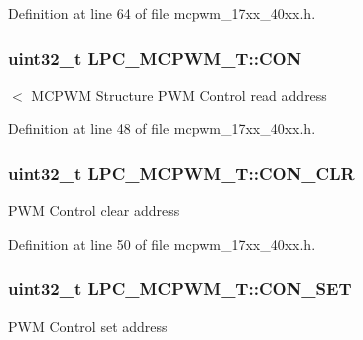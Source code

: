 Definition at line 64 of file mcpwm\+\_\+17xx\+\_\+40xx.\+h.

\subsubsection[{\texorpdfstring{C\+ON}{CON}}]{ uint32\+\_\+t L\+P\+C\+\_\+\+M\+C\+P\+W\+M\+\_\+\+T\+::\+C\+ON}\hypertarget{structLPC__MCPWM__T_ae047b5f0f2ca06bbaa663ce2458ae7ad}{}\label{structLPC__MCPWM__T_ae047b5f0f2ca06bbaa663ce2458ae7ad}
$<$ M\+C\+P\+WM Structure P\+WM Control read address 

Definition at line 48 of file mcpwm\+\_\+17xx\+\_\+40xx.\+h.

\subsubsection[{\texorpdfstring{C\+O\+N\+\_\+\+C\+LR}{CON_CLR}}]{ uint32\+\_\+t L\+P\+C\+\_\+\+M\+C\+P\+W\+M\+\_\+\+T\+::\+C\+O\+N\+\_\+\+C\+LR}\hypertarget{structLPC__MCPWM__T_a22b564b847caa28e9f0c53ff38375cc3}{}\label{structLPC__MCPWM__T_a22b564b847caa28e9f0c53ff38375cc3}
P\+WM Control clear address 

Definition at line 50 of file mcpwm\+\_\+17xx\+\_\+40xx.\+h.

\subsubsection[{\texorpdfstring{C\+O\+N\+\_\+\+S\+ET}{CON_SET}}]{ uint32\+\_\+t L\+P\+C\+\_\+\+M\+C\+P\+W\+M\+\_\+\+T\+::\+C\+O\+N\+\_\+\+S\+ET}\hypertarget{structLPC__MCPWM__T_a3dc36e144bb33d1756f06c765726f15d}{}\label{structLPC__MCPWM__T_a3dc36e144bb33d1756f06c765726f15d}
P\+WM Control set address 


